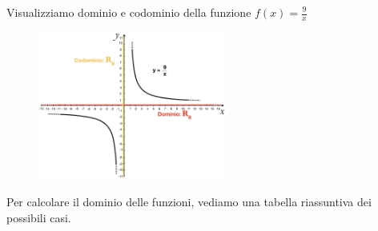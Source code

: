\begin{esempio}
  Visualizziamo dominio e codominio della funzione $f(x)=\frac{9}{x}$
  \begin{figure}[htpb!]
  \centering
  \includegraphics[width=0.55\textwidth]{img/2c_funz.png}
  \end{figure}
\end{esempio}

\newpage 
Per calcolare il dominio delle funzioni, vediamo una tabella riassuntiva dei 
possibili casi.\\

